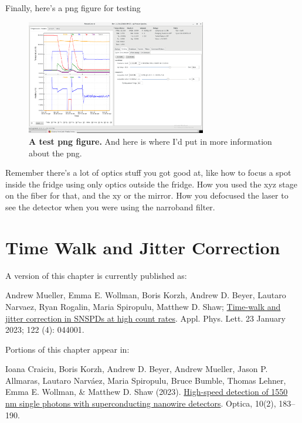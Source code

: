 \documentclass[11pt]{caltech_thesis} %
\begin{document}
Finally, here's a png figure for testing

\hypertarget{fig:test_png_figure}{%
\begin{figure}
\centering
\includegraphics[width=0.7\textwidth,height=\textheight]{./chapter_02/figs/fridge.png}
\caption[{A png figure.}]{\textbf{A test png figure.} And here is where I'd put in more information about the png.}
\label{fig:test_png_figure}
\end{figure}
}

Remember there's a lot of optics stuff you got good at, like how to focus a spot inside the fridge using only optics outside the fridge. How you used the xyz stage on the fiber for that, and the xy or the mirror. How you defocused the laser to see the detector when you were using the narroband filter.

\hypertarget{time-walk-and-jitter-correction}{%
\chapter{Time Walk and Jitter Correction}\label{time-walk-and-jitter-correction}}

A version of this chapter is currently published as:

Andrew Mueller, Emma E. Wollman, Boris Korzh, Andrew D. Beyer, Lautaro Narvaez, Ryan Rogalin, Maria Spiropulu, Matthew D. Shaw; \href{https://pubs.aip.org/aip/apl/article/122/4/044001/2870246/Time-walk-and-jitter-correction-in-SNSPDs-at-high}{Time-walk and jitter correction in SNSPDs at high count rates}. Appl. Phys. Lett. 23 January 2023; 122 (4): 044001.

Portions of this chapter appear in:

Ioana Craiciu, Boris Korzh, Andrew D. Beyer, Andrew Mueller, Jason P. Allmaras, Lautaro Narváez, Maria Spiropulu, Bruce Bumble, Thomas Lehner, Emma E. Wollman, \& Matthew D. Shaw (2023). \href{https://opg.optica.org/optica/fulltext.cfm?uri=optica-10-2-183\&id=525546}{High-speed detection of 1550 nm single photons with superconducting nanowire detectors}. Optica, 10(2), 183--190.
\end{document}
